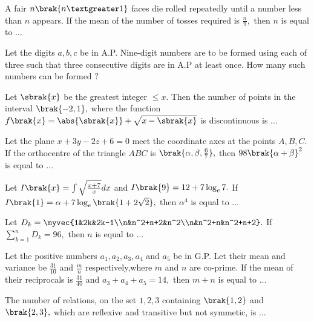 \iffalse
\title{2023}
\author{EE24BTECH11008}
\section{integer}
\fi
           \item A fair $n\brak{n \textgreater 1}$ faces die rolled repeatedly until a number less than $n$ appears. If the mean of the number of tosses required is $\frac{n}{9},$ then $n$ is equal to $\dots$
		  \hfill{} \\
    \item Let the digits $a,b,c$ be in A.P. Nine-digit numbers are to be formed using each of three such that three consecutive digits are in A.P at least once. How many such numbers can be formed $?$
	  \hfill{}  \\
    \item Let $\sbrak{x}$ be the greatest integer $\le x.$ Then the number of points in the interval $\brak{-2,1},$ where the function $f\brak{x}=\abs{\sbrak{x}}+\sqrt{x-\sbrak{x}}$ is discontinuous is $\dots$
	   \hfill{} \\
    \item Let the plane $x+3y-2z+6=0$ meet the coordinate axes at the points $A,B,C.$ If the orthocentre of the triangle $ABC$ is $\brak{\alpha,\beta,\frac{6}{7}},$ then $98\brak{\alpha+\beta}^2$ is equal to $\dots$
	   \hfill{} \\
    \item Let $I\brak{x}=\int\sqrt{\frac{x+7}{x}}dx$ and $I\brak{9}=12+7\log_e7.$ If $I\brak{1}=\alpha+7\log_e\brak{1+2\sqrt{2}},$ then $\alpha ^4$ is equal to $\dots$
	   \hfill{} \\
    \item Let $D_k=\myvec{1&2k&2k-1\\n&n^2+n+2&n^2\\n&n^2+n&n^2+n+2}.$ If $\sum_{k=1}^nD_k=96,$ then $n$ is equal to $\dots$
	  \hfill{}  \\
    \item Let the positive numbers $a_1,a_2,a_3,a_4$ and $a_5$ be in G.P. Let their mean and variance be $\frac{31}{10}$ and $\frac{m}{n}$ respectively,where $m$ and $n$ are co-prime. If the mean of their reciprocals is $\frac{31}{40}$ and $a_3+a_4+a_5=14,$ then $m+n$ is equal to $\dots$
	   \hfill{} \\
    \item The number of relations, on the set ${1,2,3}$ containing $\brak{1,2}$ and $\brak{2,3},$ which are reflexive and transitive but not symmetic, is $\dots$
